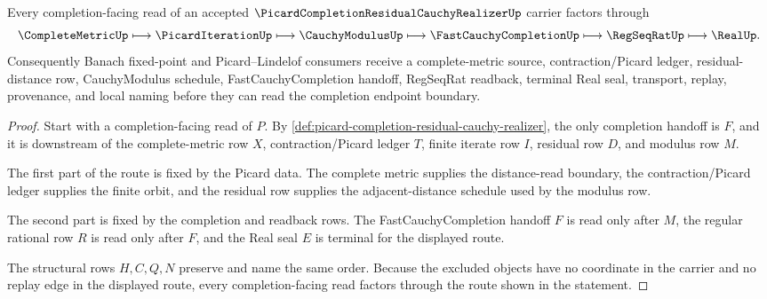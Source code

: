 
\begin{theorem}
\label{thm:picard-completion-residual-cauchy-realizer-handoff}
Every completion-facing read of an accepted $\PicardCompletionResidualCauchyRealizerUp$ carrier factors through
$$
\CompleteMetricUp \longmapsto \PicardIterationUp \longmapsto \CauchyModulusUp \longmapsto \FastCauchyCompletionUp \longmapsto \RegSeqRatUp \longmapsto \RealUp .
$$
Consequently Banach fixed-point and Picard--Lindelof consumers receive a complete-metric source, contraction/Picard ledger, residual-distance row, CauchyModulus schedule, FastCauchyCompletion handoff, RegSeqRat readback, terminal Real seal, transport, replay, provenance, and local naming before they can read the completion endpoint boundary.
\end{theorem}
\begin{proof}
Start with a completion-facing read of $P$. By \autoref{def:picard-completion-residual-cauchy-realizer}, the only completion handoff is $F$, and it is downstream of the complete-metric row $X$, contraction/Picard ledger $T$, finite iterate row $I$, residual row $D$, and modulus row $M$.

The first part of the route is fixed by the Picard data. The complete metric supplies the distance-read boundary, the contraction/Picard ledger supplies the finite orbit, and the residual row supplies the adjacent-distance schedule used by the modulus row.

The second part is fixed by the completion and readback rows. The FastCauchyCompletion handoff $F$ is read only after $M$, the regular rational row $R$ is read only after $F$, and the Real seal $E$ is terminal for the displayed route.

The structural rows $H,C,Q,N$ preserve and name the same order. Because the excluded objects have no coordinate in the carrier and no replay edge in the displayed route, every completion-facing read factors through the route shown in the statement.
\end{proof}


